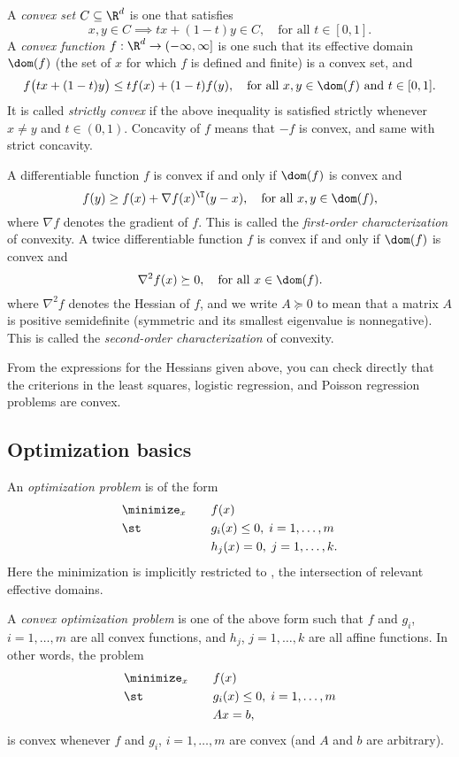 \documentclass{article}
\begin{document}
A \emph{convex set} $C \subseteq \R^d$ is one that satisfies 
\[
x, y \in C \implies t x + (1-t) y \in C, \quad \text{for all $t \in [0,1]$}. 
\]
A \emph{convex function} $f : \R^d \to (-\infty, \infty]$ is one such that its
effective domain $\dom(f)$ (the set of $x$ for which $f$ is defined and finite)
is a convex set, and 
\[
f \big(t x + (1-t) y\big) \leq t f(x) + (1-t) f(y),  \quad \text{for all $x,y
  \in \dom(f)$ and $t \in [0,1]$}. 
\]
It is called \emph{strictly convex} if the above inequality is satisfied
strictly whenever $x \not= y$ and $t \in (0,1)$. Concavity of $f$ means that
$-f$ is convex, and same with strict concavity. 

A differentiable function $f$ is convex if and only if $\dom(f)$ is convex and  
\[
f(y) \geq f(x) + \nabla f(x)^\T (y-x), \quad \text{for all $x,y \in \dom(f)$}, 
\]
where $\nabla f$ denotes the gradient of $f$. This is called the
\emph{first-order characterization} of convexity. A twice differentiable
function $f$ is convex if and only if $\dom(f)$ is convex and
\[
\nabla^2 f(x) \succeq 0, \quad \text{for all $x \in \dom(f)$}.
\]
where $\nabla^2 f$ denotes the Hessian of $f$, and we write $A \succeq 0$ to
mean that a matrix $A$ is positive semidefinite (symmetric and its smallest
eigenvalue is nonnegative). This is called the \emph{second-order
  characterization} of convexity. 

From the expressions for the Hessians given above, you can check directly that
the criterions in the least squares, logistic regression, and Poisson regression
problems are convex.  

\subsection{Optimization basics}

An \emph{optimization problem} is of the form
\begin{alignat*}{2}
&\minimize_x \quad && f(x) \\
&\st \quad && g_i(x) \leq 0, \; i=1,\dots,m \\ 
& && h_j(x) = 0, \; j=1,\dots,k.
\end{alignat*}
Here the minimization is implicitly restricted to , the intersection
of relevant effective domains.

A \emph{convex optimization problem} is one of the above form such that $f$ and
$g_i$, $i=1,\dots,m$ are all convex functions, and $h_j$, $j=1,\dots,k$ are
all affine functions. In other words, the problem 
\begin{alignat*}{2}
&\minimize_x \quad && f(x) \\
&\st \quad && g_i(x) \leq 0, \; i=1,\dots,m \\ 
& && Ax = b,
\end{alignat*}
is convex whenever $f$ and $g_i$, $i=1,\dots,m$ are convex (and $A$ and $b$ are
arbitrary). 
\end{document}
